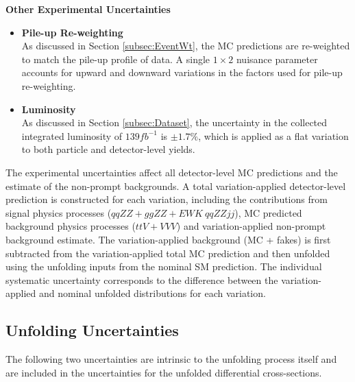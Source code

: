 \textbf{Other Experimental Uncertainties }
\begin{itemize}
    \item{\textbf{Pile-up Re-weighting}\\ As discussed in Section \ref{subsec:EventWt}, the MC predictions are re-weighted to match the pile-up profile of data. A single $1\times2$ nuisance parameter accounts for upward and downward variations in the factors used for pile-up re-weighting. }
    \item{\textbf{Luminosity}\\ As discussed in Section \ref{subsec:Dataset}, the uncertainty in the collected integrated luminosity of $139 fb^{-1}$ is $\pm1.7\%$, which is applied as a flat variation to both particle and detector-level yields. } 
\end{itemize}

The experimental uncertainties affect all detector-level MC predictions and the estimate of the non-prompt backgrounds. A total variation-applied detector-level prediction is constructed for each variation, including the contributions from signal physics processes ($qqZZ+ggZZ+EWK~qqZZjj$), MC predicted background physics processes ($ttV+VVV$) and variation-applied non-prompt background estimate. The variation-applied background (MC + fakes) is first subtracted from the variation-applied total MC prediction and then unfolded using the unfolding inputs from the nominal SM prediction. The individual systematic uncertainty corresponds to the difference between the variation-applied and nominal unfolded distributions for each variation.  

\subsection{Unfolding Uncertainties}
\label{subsec:UnfoldingUnc}
The following two uncertainties are intrinsic to the unfolding process itself and are included in the uncertainties for the unfolded differential cross-sections.

